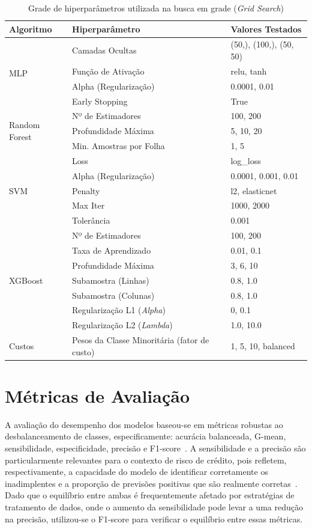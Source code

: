 \begin{table}[H]
  \centering
  \caption{Grade de hiperparâmetros utilizada na busca em grade (\textit{Grid Search})}
  \label{tab:grid-search-params}
  \begin{tabular}{|l|l|l|}
    \hline
    \textbf{Algoritmo} & \textbf{Hiperparâmetro} & \textbf{Valores Testados} \\ \hline
    \multirow{4}{*}{MLP} & Camadas Ocultas & (50,), (100,), (50, 50) \\
    & Função de Ativação & relu, tanh \\
    & Alpha (Regularização) & 0.0001, 0.01 \\
    & Early Stopping & True \\ \hline
    \multirow{3}{*}{Random Forest} & Nº de Estimadores & 100, 200 \\
    & Profundidade Máxima & 5, 10, 20 \\
    & Min. Amostras por Folha & 1, 5 \\ \hline
    \multirow{5}{*}{SVM} & Loss & log\_loss \\
    & Alpha (Regularização) & 0.0001, 0.001, 0.01 \\
    & Penalty & l2, elasticnet \\
    & Max Iter & 1000, 2000 \\
    & Tolerância & 0.001 \\ \hline
    \multirow{7}{*}{XGBoost} & Nº de Estimadores & 100, 200 \\
    & Taxa de Aprendizado & 0.01, 0.1 \\
    & Profundidade Máxima & 3, 6, 10 \\
    & Subamostra (Linhas) & 0.8, 1.0 \\
    & Subamostra (Colunas) & 0.8, 1.0 \\
    & Regularização L1 (\textit{Alpha}) & 0, 0.1 \\
    & Regularização L2 (\textit{Lambda}) & 1.0, 10.0 \\ \hline
    \multirow{1}{*}{Custos} & Pesos da Classe Minoritária (fator de custo) & 1, 5, 10, balanced \\ \hline
  \end{tabular}
\end{table}

\section{Métricas de Avaliação}\label{sec:metricas}

A avaliação do desempenho dos modelos baseou-se em métricas robustas ao desbalanceamento de classes, especificamente: acurácia balanceada, G-mean, sensibilidade, especificidade, precisão e F1-score~\cite{Namvar2018}. A sensibilidade e a precisão são particularmente relevantes para o contexto de risco de crédito, pois refletem, respectivamente, a capacidade do modelo de identificar corretamente os inadimplentes e a proporção de previsões positivas que são realmente corretas~\cite{Wei2025}. Dado que o equilíbrio entre ambas é frequentemente afetado por estratégias de tratamento de dados, onde o aumento da sensibilidade pode levar a uma redução na precisão, utilizou-se o F1-score para verificar o equilíbrio entre essas métricas.


